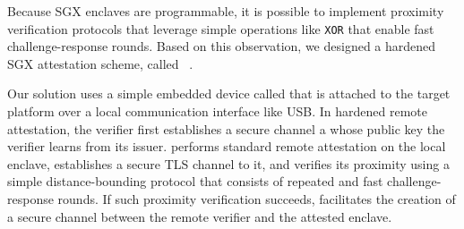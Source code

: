 Because SGX enclaves are programmable, it is possible to implement proximity verification protocols that leverage simple operations like \texttt{XOR} that enable fast challenge-response rounds. Based on this observation, we designed a hardened SGX attestation scheme, called \proximitee~\cite{proximitee}. %

Our solution uses a simple embedded device called \key that is attached to the target platform over a local communication interface like USB. In hardened remote attestation, the verifier first establishes a secure channel a \key whose public key the verifier learns from its issuer. \key performs standard remote attestation on the local enclave, establishes a secure TLS channel to it, and verifies its proximity using a simple distance-bounding protocol that consists of repeated and fast challenge-response rounds. If such proximity verification succeeds, \key facilitates the creation of a secure channel between the remote verifier and the attested enclave. 





